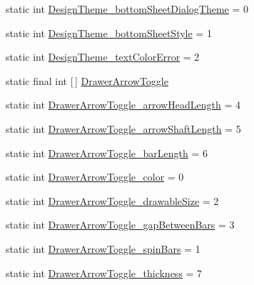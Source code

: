 \begin{DoxyCompactItemize}
\item 
static int \hyperlink{classandroid_1_1support_1_1v7_1_1mediarouter_1_1R_1_1styleable_a5217864258d601be9dafb9685000c417}{Design\+Theme\+\_\+bottom\+Sheet\+Dialog\+Theme} = 0
\item 
static int \hyperlink{classandroid_1_1support_1_1v7_1_1mediarouter_1_1R_1_1styleable_a6056eb777548f236d844db615fe3ad4a}{Design\+Theme\+\_\+bottom\+Sheet\+Style} = 1
\item 
static int \hyperlink{classandroid_1_1support_1_1v7_1_1mediarouter_1_1R_1_1styleable_a95d15a3901e4631d2c63fa74fc1884e5}{Design\+Theme\+\_\+text\+Color\+Error} = 2
\item 
static final int \mbox{[}$\,$\mbox{]} \hyperlink{classandroid_1_1support_1_1v7_1_1mediarouter_1_1R_1_1styleable_a71030bdd9f81aafe32f56767ba04e5b0}{Drawer\+Arrow\+Toggle}
\item 
static int \hyperlink{classandroid_1_1support_1_1v7_1_1mediarouter_1_1R_1_1styleable_a54583b5b62def598121ead1148201937}{Drawer\+Arrow\+Toggle\+\_\+arrow\+Head\+Length} = 4
\item 
static int \hyperlink{classandroid_1_1support_1_1v7_1_1mediarouter_1_1R_1_1styleable_a0372ce9b69df23ee04c3dbddd6e5ddd3}{Drawer\+Arrow\+Toggle\+\_\+arrow\+Shaft\+Length} = 5
\item 
static int \hyperlink{classandroid_1_1support_1_1v7_1_1mediarouter_1_1R_1_1styleable_a2324cb3e0816358e8359cc591b432f3e}{Drawer\+Arrow\+Toggle\+\_\+bar\+Length} = 6
\item 
static int \hyperlink{classandroid_1_1support_1_1v7_1_1mediarouter_1_1R_1_1styleable_a8bd8d9885033bad0fe40599a324d5680}{Drawer\+Arrow\+Toggle\+\_\+color} = 0
\item 
static int \hyperlink{classandroid_1_1support_1_1v7_1_1mediarouter_1_1R_1_1styleable_a3312cfca0f8aa8b24370e5800a56eead}{Drawer\+Arrow\+Toggle\+\_\+drawable\+Size} = 2
\item 
static int \hyperlink{classandroid_1_1support_1_1v7_1_1mediarouter_1_1R_1_1styleable_a9ab9b13a15b2523a68b1fd3f98d047be}{Drawer\+Arrow\+Toggle\+\_\+gap\+Between\+Bars} = 3
\item 
static int \hyperlink{classandroid_1_1support_1_1v7_1_1mediarouter_1_1R_1_1styleable_aae8cdc41456778b50a759a297ff28dad}{Drawer\+Arrow\+Toggle\+\_\+spin\+Bars} = 1
\item 
static int \hyperlink{classandroid_1_1support_1_1v7_1_1mediarouter_1_1R_1_1styleable_afe1e37e12d66a5326cf5638f522e86fd}{Drawer\+Arrow\+Toggle\+\_\+thickness} = 7
\item 

\end{DoxyCompactItemize}
